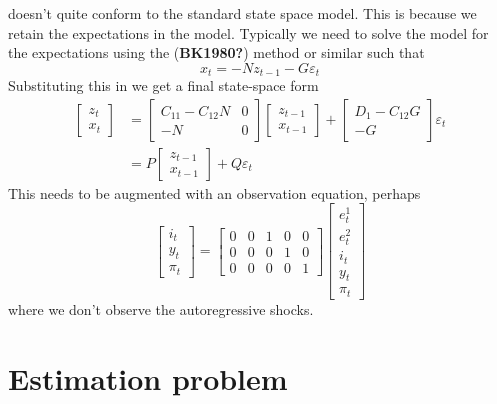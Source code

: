 \documentclass[
  letterpaper,
]{book}
\begin{document}
doesn't quite conform to the standard state space model. This is because
we retain the expectations in the model. Typically we need to solve the
model for the expectations using the (\textbf{BK1980?}) method or
similar such that \[
 x_t = -N z_{t-1} - G \varepsilon_t
\] Substituting this in we get a final state-space form \begin{align}
\begin{bmatrix} z_t \\ x_t \end{bmatrix} &= \begin{bmatrix} C_{11} - C_{12}N & 0 \\ -N & 0 \end{bmatrix} \begin{bmatrix} z_{t-1} \\ x_{t-1} \end{bmatrix} + \begin{bmatrix} D_1-C_{12}G \\ -G \end{bmatrix} \varepsilon_t \\
 &= P \begin{bmatrix} z_{t-1} \\ x_{t-1} \end{bmatrix} + Q \varepsilon_t
\end{align} This needs to be augmented with an observation equation,
perhaps \[
\begin{bmatrix} i_t \\ y_t \\ \pi_t \end{bmatrix} 
 = \begin{bmatrix} 0 & 0 & 1 & 0 & 0 \\ 
                0 & 0 & 0 & 1 & 0 \\ 
                0 & 0 & 0 & 0 & 1 
\end{bmatrix}
\begin{bmatrix} e^1_t \\ e^2_t \\ i_t \\ y_t \\ \pi_t \end{bmatrix} 
\] where we don't observe the autoregressive shocks.

\hypertarget{estimation-problem}{%
\section{Estimation problem}\label{estimation-problem}}
\end{document}
